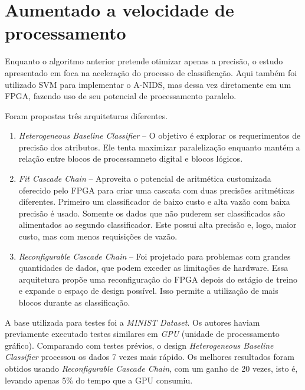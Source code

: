 \section{Aumentado a velocidade de processamento}
Enquanto o algoritmo anterior pretende otimizar apenas a precisão, o estudo apresentado em \cite{papadonikolakis12}
foca na aceleração do processo de classificação. Aqui também foi utilizado SVM para implementar o A-NIDS, mas dessa
vez diretamente em um FPGA, fazendo uso de seu potencial de processamento paralelo.
\par Foram propostas três arquiteturas diferentes.
\begin{enumerate}
    \item \textit{Heterogeneous Baseline Classifier} -- O objetivo é explorar os requerimentos de precisão dos atributos. Ele
    tenta maximizar paralelização enquanto mantém a relação entre blocos de processamneto digital e blocos lógicos.
    \item \textit{Fit Cascade Chain} -- Aproveita o potencial de aritmética customizada oferecido pelo FPGA para criar uma
    cascata com duas precisões aritméticas diferentes. Primeiro um classificador de baixo custo e alta vazão com baixa
    precisão é usado. Somente os dados que não puderem ser classificados são alimentados ao segundo classificador. Este
    possui alta precisão e, logo, maior custo, mas com menos requisições de vazão.
    \item \textit{Reconfigurable Cascade Chain} -- Foi projetado para problemas com grandes quantidades de dados, que podem
    exceder as limitações de hardware. Essa arquitetura propõe uma reconfiguração do FPGA depois do estágio de treino e
    expande o espaço de design possível. Isso permite a utilização de mais blocos durante as classificação.
\end{enumerate}
\par A base utilizada para testes foi a \textit{MINIST Dataset}. Os autores haviam previamente executado testes similares em \emph{GPU} (unidade de processamento gráfico).
Comparando com testes prévios, o design \textit{Heterogeneous Baseline Classifier} processou os dados 7 vezes mais rápido. Os melhores resultados foram
obtidos usando \textit{Reconfigurable Cascade Chain}, com um ganho de 20 vezes, isto é, levando apenas 5\% do tempo
que a GPU consumiu.